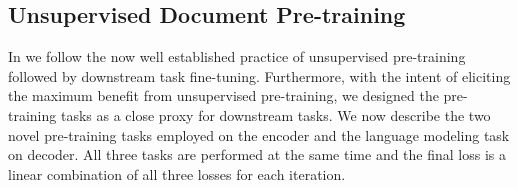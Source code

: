 \documentclass[10pt,twocolumn,letterpaper]{article}
\begin{document}
\begin{table}
\centering
{}
\caption{\textbf{\papertitle variants}: dim is embedding dimensionality. ff is output dim of feed-forward layer. E is encoder and D is decoder. attn. H is attention heads.
}
\label{table:dfv2_variants}
\vspace{-0.6cm}
\end{table}

\subsection{Unsupervised Document Pre-training}
\label{sec:approach:pretrain}

In \papertitle we follow the now well established practice of unsupervised pre-training followed by downstream task fine-tuning. Furthermore, with the intent of eliciting the maximum benefit from unsupervised pre-training, we designed the pre-training tasks as a close proxy for downstream tasks. We now describe the two novel pre-training tasks employed on the encoder and the language modeling task on decoder. All three tasks are performed at the same time and the final loss is a linear combination of all three losses for each iteration.
\end{document}
